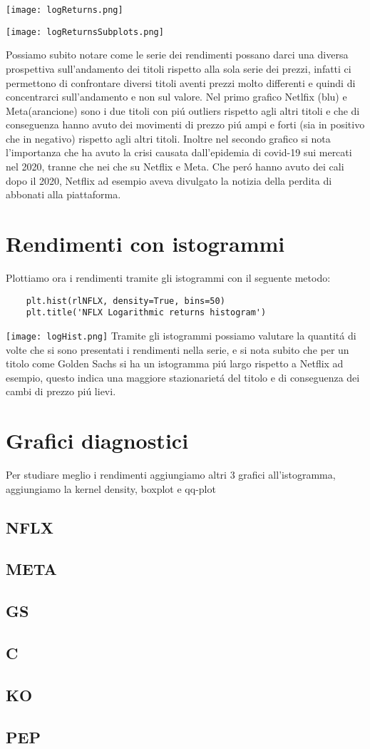 \documentclass{report}
\begin{document}
\texttt{[image: logReturns.png]}

\texttt{[image: logReturnsSubplots.png]}

Possiamo subito notare come le serie dei rendimenti possano darci una diversa prospettiva sull'andamento dei titoli rispetto alla sola serie dei prezzi, infatti ci permettono di confrontare diversi titoli aventi prezzi molto differenti e quindi di concentrarci sull'andamento e non sul valore. Nel primo grafico Netlfix (blu) e Meta(arancione) sono i due titoli con piú outliers rispetto agli altri titoli e che di conseguenza hanno avuto dei movimenti di prezzo  piú ampi e forti (sia in positivo che in negativo) rispetto agli altri titoli. Inoltre nel secondo grafico si nota l'importanza che ha avuto la crisi causata dall'epidemia di covid-19 sui mercati nel 2020, tranne che nei che su Netflix e Meta. Che peró hanno avuto dei cali dopo il 2020, Netflix ad esempio aveva divulgato la notizia della perdita di abbonati alla piattaforma.
\section{Rendimenti con istogrammi}
Plottiamo ora i rendimenti tramite gli istogrammi con il seguente metodo:
\begin{lstlisting}
    plt.hist(rlNFLX, density=True, bins=50)
    plt.title('NFLX Logarithmic returns histogram')
\end{lstlisting}

\texttt{[image: logHist.png]}
Tramite gli istogrammi possiamo valutare la quantitá di volte che si sono presentati i rendimenti nella serie, e si nota subito che per un titolo come Golden Sachs si ha un istogramma piú largo rispetto a Netflix ad esempio, questo indica una maggiore stazionarietá del titolo e di conseguenza dei cambi di prezzo piú lievi.
\section{Grafici diagnostici}
Per studiare meglio i rendimenti aggiungiamo altri 3 grafici all'istogramma, aggiungiamo la kernel density, boxplot e qq-plot
\subsection{NFLX}
\subsection{META}
\subsection{GS}
\subsection{C}
\subsection{KO}
\subsection{PEP}
\tableofcontents
\end{document}
